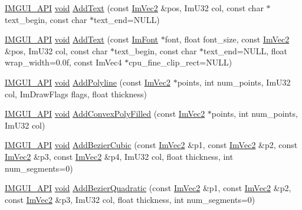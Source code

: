 \begin{DoxyCompactItemize}
\hyperlink{imgui_8h_a43829975e84e45d1149597467a14bbf5}{I\+M\+G\+U\+I\+\_\+\+A\+PI} \hyperlink{imgui__impl__opengl3__loader_8h_ac668e7cffd9e2e9cfee428b9b2f34fa7}{void} \hyperlink{structImDrawList_ac5221bd86b3429f6d5b6e6ffe454942d}{Add\+Text} (const \hyperlink{structImVec2}{Im\+Vec2} \&pos, Im\+U32 col, const char $\ast$text\+\_\+begin, const char $\ast$text\+\_\+end=N\+U\+LL)
\item 
\hyperlink{imgui_8h_a43829975e84e45d1149597467a14bbf5}{I\+M\+G\+U\+I\+\_\+\+A\+PI} \hyperlink{imgui__impl__opengl3__loader_8h_ac668e7cffd9e2e9cfee428b9b2f34fa7}{void} \hyperlink{structImDrawList_a0a226cbe9bb1480428e145d8535cda26}{Add\+Text} (const \hyperlink{structImFont}{Im\+Font} $\ast$font, float font\+\_\+size, const \hyperlink{structImVec2}{Im\+Vec2} \&pos, Im\+U32 col, const char $\ast$text\+\_\+begin, const char $\ast$text\+\_\+end=N\+U\+LL, float wrap\+\_\+width=0.\+0f, const Im\+Vec4 $\ast$cpu\+\_\+fine\+\_\+clip\+\_\+rect=\+N\+U\+L\+L)
\item 
\hyperlink{imgui_8h_a43829975e84e45d1149597467a14bbf5}{I\+M\+G\+U\+I\+\_\+\+A\+PI} \hyperlink{imgui__impl__opengl3__loader_8h_ac668e7cffd9e2e9cfee428b9b2f34fa7}{void} \hyperlink{structImDrawList_abc568847b1113e624456436bfab1b307}{Add\+Polyline} (const \hyperlink{structImVec2}{Im\+Vec2} $\ast$points, int num\+\_\+points, Im\+U32 col, Im\+Draw\+Flags flags, float thickness)
\item 
\hyperlink{imgui_8h_a43829975e84e45d1149597467a14bbf5}{I\+M\+G\+U\+I\+\_\+\+A\+PI} \hyperlink{imgui__impl__opengl3__loader_8h_ac668e7cffd9e2e9cfee428b9b2f34fa7}{void} \hyperlink{structImDrawList_ad2accc0a74845b08bd0e6fae6183d6d0}{Add\+Convex\+Poly\+Filled} (const \hyperlink{structImVec2}{Im\+Vec2} $\ast$points, int num\+\_\+points, Im\+U32 col)
\item 
\hyperlink{imgui_8h_a43829975e84e45d1149597467a14bbf5}{I\+M\+G\+U\+I\+\_\+\+A\+PI} \hyperlink{imgui__impl__opengl3__loader_8h_ac668e7cffd9e2e9cfee428b9b2f34fa7}{void} \hyperlink{structImDrawList_a90ebb3c38b997ef3a3adb4d211a1b2a8}{Add\+Bezier\+Cubic} (const \hyperlink{structImVec2}{Im\+Vec2} \&p1, const \hyperlink{structImVec2}{Im\+Vec2} \&p2, const \hyperlink{structImVec2}{Im\+Vec2} \&p3, const \hyperlink{structImVec2}{Im\+Vec2} \&p4, Im\+U32 col, float thickness, int num\+\_\+segments=0)
\item 
\hyperlink{imgui_8h_a43829975e84e45d1149597467a14bbf5}{I\+M\+G\+U\+I\+\_\+\+A\+PI} \hyperlink{imgui__impl__opengl3__loader_8h_ac668e7cffd9e2e9cfee428b9b2f34fa7}{void} \hyperlink{structImDrawList_a2ca1f97b873778fc53fa4c1f1ca8bb1f}{Add\+Bezier\+Quadratic} (const \hyperlink{structImVec2}{Im\+Vec2} \&p1, const \hyperlink{structImVec2}{Im\+Vec2} \&p2, const \hyperlink{structImVec2}{Im\+Vec2} \&p3, Im\+U32 col, float thickness, int num\+\_\+segments=0)

\end{DoxyCompactItemize}

